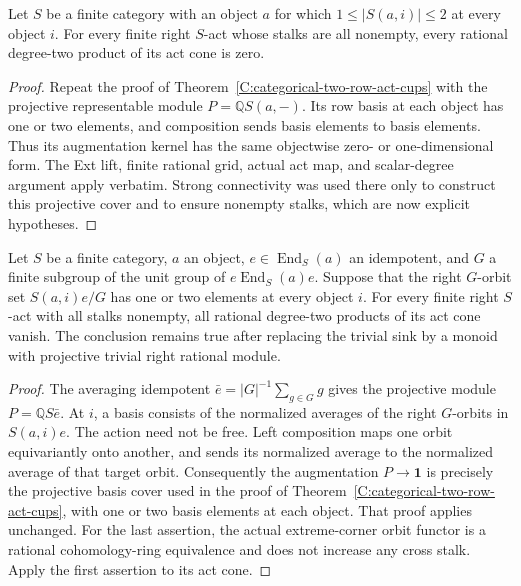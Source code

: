 \begin{corollary}\label{C:two-valued-representable-act-cups}
Let $S$ be a finite category with an object $a$ for which
$1\leq|S(a,i)|\leq2$ at every object $i$. For every finite right
$S$-act whose stalks are all nonempty, every rational degree-two
product of its act cone is zero.
\end{corollary}
\begin{proof}
Repeat the proof of Theorem~\ref{C:categorical-two-row-act-cups}
with the projective representable module $P=\mathbb QS(a,-)$.
Its row basis at each object has one or two elements, and
composition sends basis elements to basis elements. Thus its
augmentation kernel has the same objectwise zero- or
one-dimensional form. The Ext lift, finite rational grid, actual
act map, and scalar-degree argument apply verbatim. Strong
connectivity was used there only to construct this projective
cover and to ensure nonempty stalks, which are now explicit
hypotheses.
\end{proof}

\begin{corollary}\label{C:two-orbit-projective-cover-act-cups}
Let $S$ be a finite category, $a$ an object, $e\in\operatorname{End}_S(a)$
an idempotent, and $G$ a finite subgroup of the unit group of
$e\operatorname{End}_S(a)e$. Suppose that the right $G$-orbit
set $S(a,i)e/G$ has one or two elements at every object $i$.
For every finite right $S$-act with all stalks nonempty, all
rational degree-two products of its act cone vanish.
The conclusion remains true after replacing the trivial sink by
a monoid with projective trivial right rational module.
\end{corollary}
\begin{proof}
The averaging idempotent $\bar e=|G|^{-1}\sum_{g\in G}g$ gives
the projective module $P=\mathbb QS\bar e$. At $i$, a basis
consists of the normalized averages of the right $G$-orbits
in $S(a,i)e$. The action need not be free. Left composition
maps one orbit equivariantly onto another, and sends its normalized
average to the normalized average of that target orbit.
Consequently the augmentation $P\to\mathbf1$ is precisely
the projective basis cover used in the proof of
Theorem~\ref{C:categorical-two-row-act-cups}, with one or two
basis elements at each object. That proof applies unchanged.
For the last assertion, the actual extreme-corner orbit functor
is a rational cohomology-ring equivalence and does not increase
any cross stalk. Apply the first assertion to its act cone.
\end{proof}

